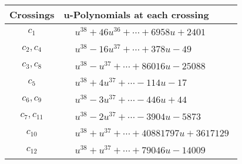 \documentclass[1p]{elsarticle_modified}
\theoremstyle{definition}
\begin{document}
\begin{tabular}{m{50pt}|m{274pt}}
Crossings & \hspace{64pt}u-Polynomials at each crossing \\
\hline $$\begin{aligned}c_{1}\end{aligned}$$&$\begin{aligned}
&u^{38}+46 u^{36}+\cdots+6958 u+2401
\end{aligned}$\\
\hline $$\begin{aligned}c_{2},c_{4}\end{aligned}$$&$\begin{aligned}
&u^{38}-16 u^{37}+\cdots+378 u-49
\end{aligned}$\\
\hline $$\begin{aligned}c_{3},c_{8}\end{aligned}$$&$\begin{aligned}
&u^{38}- u^{37}+\cdots+86016 u-25088
\end{aligned}$\\
\hline $$\begin{aligned}c_{5}\end{aligned}$$&$\begin{aligned}
&u^{38}+4 u^{37}+\cdots-114 u-17
\end{aligned}$\\
\hline $$\begin{aligned}c_{6},c_{9}\end{aligned}$$&$\begin{aligned}
&u^{38}-3 u^{37}+\cdots-446 u+44
\end{aligned}$\\
\hline $$\begin{aligned}c_{7},c_{11}\end{aligned}$$&$\begin{aligned}
&u^{38}-2 u^{37}+\cdots-3904 u-5873
\end{aligned}$\\
\hline $$\begin{aligned}c_{10}\end{aligned}$$&$\begin{aligned}
&u^{38}+u^{37}+\cdots+40881797 u+3617129
\end{aligned}$\\
\hline $$\begin{aligned}c_{12}\end{aligned}$$&$\begin{aligned}
&u^{38}+u^{37}+\cdots+79046 u-14009
\end{aligned}$\\
\hline
\end{tabular}\\~\\
\end{document}
